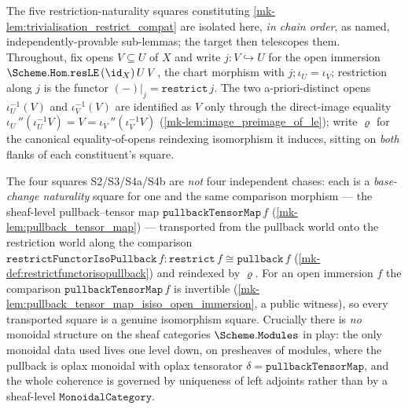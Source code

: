 The five restriction-naturality squares constituting \ref{mk-lem:trivialisation_restrict_compat}
are isolated here, \emph{in chain order}, as named, independently-provable sub-lemmas; the target
then telescopes them. Throughout, fix opens \(V \subseteq U\) of \(X\) and write
\(j : V \hookrightarrow U\) for the open immersion \(\Scheme.\mathtt{Hom.resLE}\,(\id_X)\,U\,V\),
the chart morphism with \(j \mathbin{;} \iota_U = \iota_V\); restriction along \(j\) is the
functor \((-)|_j = \mathtt{restrict}\,j\). The two a-priori-distinct opens
\(\iota_U^{-1}(V)\) and \(\iota_V^{-1}(V)\) are identified as \(V\) only through the
direct-image equality \(\iota_U\,''(\iota_U^{-1}V) = V = \iota_V\,''(\iota_V^{-1}V)\)
(\ref{mk-lem:image_preimage_of_le}); write \(\varrho\) for the canonical equality-of-opens
reindexing isomorphism it induces, sitting on \emph{both} flanks of each constituent's square.

The four squares S2/S3/S4a/S4b are \emph{not} four independent chases: each is a
\emph{base-change naturality} square for one and the same comparison morphism --- the
sheaf-level pullback--tensor map \(\mathtt{pullbackTensorMap}\,f\)
(\ref{mk-lem:pullback_tensor_map}) --- transported from the pullback world onto the
restriction world along the comparison \(\mathtt{restrictFunctorIsoPullback}\,f :
\mathtt{restrict}\,f \cong \mathtt{pullback}\,f\) (\ref{mk-def:restrictfunctorisopullback})
and reindexed by \(\varrho\). For an open immersion \(f\) the comparison
\(\mathtt{pullbackTensorMap}\,f\) is invertible
(\ref{mk-lem:pullback_tensor_map_isiso_open_immersion}, a public witness), so every
transported square is a genuine isomorphism square. Crucially there is \emph{no} monoidal
structure on the sheaf categories \(\Scheme.\mathtt{Modules}\) in play: the only monoidal
data used lives one level down, on presheaves of modules, where the pullback is oplax
monoidal with oplax tensorator \(\delta = \mathtt{pullbackTensorMap}\), and the whole
coherence is governed by uniqueness of left adjoints rather than by a sheaf-level
\(\mathtt{MonoidalCategory}\).

